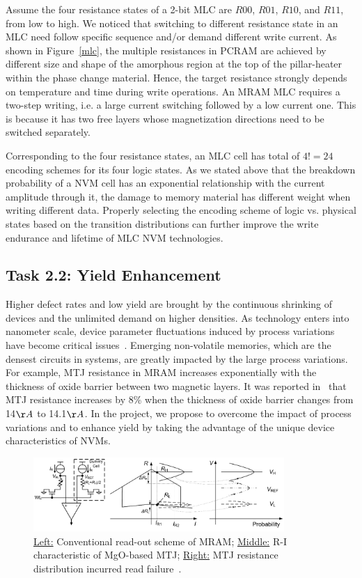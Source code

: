 Assume the four resistance states of a 2-bit MLC are $R00$, $R01$, $R10$, and $R11$, from low to high. We noticed that switching to different resistance state in an MLC need follow specific sequence and/or demand different write current. As shown in Figure~\ref{mlc}, the multiple resistances in PCRAM are achieved by different size and shape of the amorphous region at the top of the pillar-heater within the phase change material. Hence, the target resistance strongly depends on temperature and time during write operations. An MRAM MLC requires a two-step writing, i.e. a large current switching followed by a low current one. This is because it has two free layers whose magnetization directions need to be switched separately. 

Corresponding to the four resistance states, an MLC cell has total of $4! = 24$ encoding schemes for its four logic states. As we stated above that the breakdown probability of a NVM cell has an exponential relationship with the current amplitude through it, the damage to memory material has different weight when writing different data. Properly selecting the encoding scheme of logic vs. physical states based on the transition distributions can further improve the write endurance and lifetime of MLC NVM technologies.

\subsection{Task 2.2: Yield Enhancement}
Higher defect rates and low yield are brought by the continuous shrinking of devices and the unlimited demand on higher densities. As technology enters into nanometer scale, device parameter fluctuations induced by process variations have become critical issues~\cite{Asenov03}. Emerging non-volatile memories, which are the densest circuits in systems, are greatly impacted by the large process variations. For example, MTJ resistance in MRAM increases exponentially with the thickness of oxide barrier between two magnetic layers. It was reported in~\cite{Tehrani00} that MTJ resistance increases by 8\% when the thickness of oxide barrier changes from 14${\AA}$ to 14.1${\AA}$. In the project, we propose to overcome the impact of process variations and to enhance yield by taking the advantage of the unique device characteristics of NVMs.


\begin{figure}
\centering
\vspace{-10pt}
\includegraphics[width=0.85\textwidth]{./figure/5_selfref.pdf}
\vspace{-10pt}
\caption{\underline{Left:} Conventional read-out scheme of MRAM; \underline{Middle:} R-I characteristic of MgO-based MTJ; \underline{Right:} MTJ resistance distribution incurred read failure~\cite{Li09}.}
\label{selfref}
\vspace{-10pt}
\end{figure}

